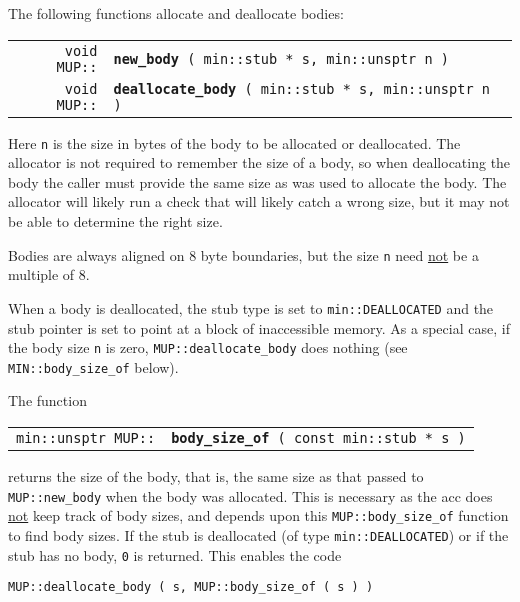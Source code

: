 \documentclass[12pt]{article}
\makeatletter
\newcommand{\ttindex}[1]{\index{#1@{\tt #1}}}
\newcommand{\MUPindex}[1]{\ttindex{MUP::#1}\ttindex{#1}}
\newcommand{\EOL}{\penalty \exhyphenpenalty}
\newenvironment{indpar}[1][0.3in]%
	{\begin{list}{}%
		     {\setlength{\itemsep}{0in}%
		      \setlength{\topsep}{0in}%
		      \setlength{\parsep}{1ex}%
		      \setlength{\labelwidth}{#1}%
		      \setlength{\leftmargin}{#1}%
		      \addtolength{\leftmargin}{\labelsep}}%
	 \item}%
	{\end{list}}
\newcommand{\LABEL}[1]{\label{#1}}
\newcommand{\MUPKEY}[1]{{\tt \bf #1}\MUPindex{#1}}
\makeatother
\begin{document}
The following functions allocate and deallocate bodies:

\begin{indpar}\begin{tabular}{@{}r@{}l@{}}
\verb|void MUP::|
    & \MUPKEY{new\_body}\verb| ( min::stub * s, min::unsptr n )|
\LABEL{MUP::NEW_BODY} \\
\verb|void MUP::|
    & \MUPKEY{deallocate\_body}\verb| ( min::stub * s, min::unsptr n )|
\LABEL{MUP::DEALLOCATE_BODY} \\
\end{tabular}\end{indpar}

Here \verb|n| is the size in bytes of the body to be allocated or deallocated.
The allocator is not required to remember the size of a body,
so when deallocating the body the caller must provide the same size
as was used to allocate the body.  The allocator will likely
run a check that will likely catch a wrong size, but it may not
be able to determine the right size.

Bodies are always aligned on 8 byte boundaries, but the size \verb|n|
need \underline{not} be a multiple of 8.

When a body is deallocated, the stub type is set to
\verb|min::DEALLOCATED| and the stub pointer is set to
point at a block of inaccessible memory.
As a special case, if the body size \verb|n| is zero,
{\tt MUP::\EOL deallocate\_\EOL body} does nothing
(see {\tt MIN::\EOL body\_\EOL size\_\EOL of} below).


The function

\begin{indpar}\begin{tabular}{@{}r@{}l@{}}
\verb|min::unsptr MUP::|
    & \MUPKEY{body\_size\_of}\verb| ( const min::stub * s )|
\LABEL{MUP::BODY_SIZE_OF} \\
\end{tabular}\end{indpar}

returns the size of the body, that is, the same size
as that passed to {\tt MUP::new\_\EOL body} when the
body was allocated.  This is necessary as the acc does
\underline{not} keep track of body sizes, and depends upon
this {\tt MUP::body\_\EOL size\_\EOL of} function to
find body sizes.  If the stub is deallocated (of type
\verb|min::DEALLOCATED|) or if the stub has no body,
\verb|0| is returned.  This enables the code
\begin{center}
\verb|MUP::deallocate_body ( s, MUP::body_size_of ( s ) )|
\end{center}
\end{document}
